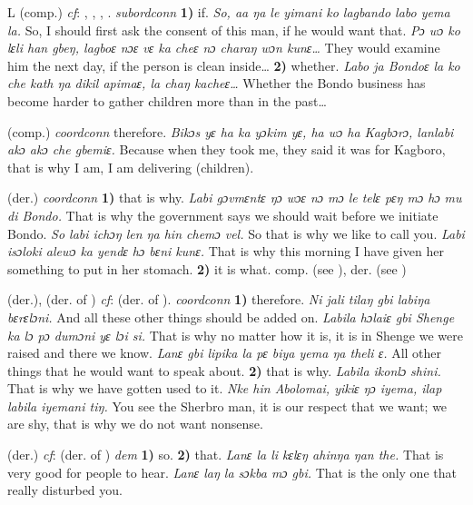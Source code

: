 \begin{letter}{L}
 (comp.) \textit{cf}: , , , . \textit{subordconn} \textbf{1)} if. \textit{So, aa ŋa le yimani ko lagbando labo yema la.} So, I should first ask the consent of this man, if he would want that. \textit{Pɔ wɔ ko lɛli han gbeŋ, lagboɛ nɔɛ vɛ ka cheɛ nɔ charaŋ wɔn kunɛ…} They would examine him the next day, if the person is clean inside… \textbf{2)} whether. \textit{Labo ja Bondoɛ la ko che kath ŋa dikil apimaɛ, la chaŋ kacheɛ…} Whether the Bondo business has become harder to gather children more than in the past…

 (comp.) \textit{coordconn} therefore. \textit{Bikɔs yɛ ha ka yɔkim yɛ, ha wɔ ha Kagbɔrɔ, lanlabi akɔ akɔ che gbemiɛ.} Because when they took me, they said it was for Kagboro, that is why I am, I am delivering (children).

 (der.) \textit{coordconn} \textbf{1)} that is why. \textit{Labi gɔvmɛntɛ ŋɔ wɔɛ nɔ mɔ le telɛ pɛŋ mɔ hɔ mu di Bondo.} That is why the government says we should wait before we initiate Bondo. \textit{So labi ichɔŋ len ŋa hin chemɔ vel.} So that is why we like to call you. \textit{Labi isɔloki alewɔ ka yendɛ hɔ bɛni kunɛ.} That is why this morning I have given her something to put in her stomach. \textbf{2)} it is what. comp.  (see ), der.  (see )

 (der.), (der. of ) \textit{cf}:  (der. of ). \textit{coordconn} \textbf{1)} therefore. \textit{Ni jali tilaŋ gbi labiŋa bɛrɛlɔni.} And all these other things should be added on. \textit{Labila hɔlaiɛ gbi Shenge ka lɔ pɔ dumɔni yɛ lɔi si.} That is why no matter how it is, it is in Shenge we were raised and there we know. \textit{Lanɛ gbi lipika la pɛ biya yema ŋa theli ɛ.} All other things that he would want to speak about. \textbf{2)} that is why. \textit{Labila ikonlɔ shini.} That is why we have gotten used to it. \textit{Nke hin Abolomai, yikiɛ ŋɔ iyema, ilap labila iyemani tiŋ.} You see the Sherbro man, it is our respect that we want; we are shy, that is why we do not want nonsense.

 (der.) \textit{cf}:  (der. of ) \textit{dem} \textbf{1)} so. \textbf{2)} that. \textit{Lanɛ la li kɛlɛŋ ahinŋa ŋan the.} That is very good for people to hear. \textit{Lanɛ laŋ la sɔkba mɔ gbi.} That is the only one that really disturbed you.


\end{letter}
